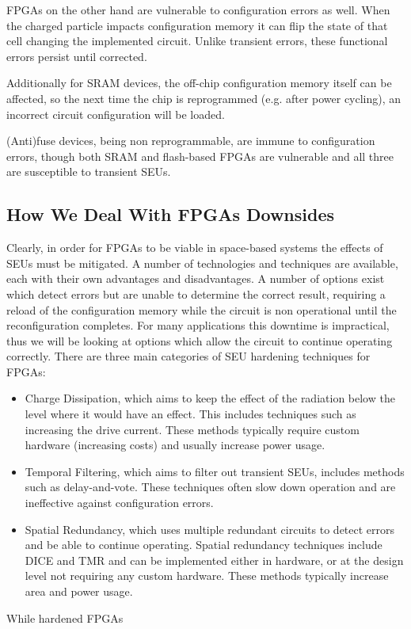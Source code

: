 \documentclass[12pt,final,oneside]{dwThesis} %
\begin{document}
   \glspl{FPGA} on the other hand are vulnerable to configuration errors as
   well. When the charged particle impacts configuration memory it can flip the
   state of that cell changing the implemented circuit. Unlike transient
   errors, these functional errors persist until corrected.

   Additionally for \gls{SRAM} devices, the off-chip configuration memory
   itself can be affected, so the next time the chip is reprogrammed (e.g.
   after power cycling), an incorrect circuit configuration will be loaded.

   (Anti)fuse devices, being non reprogrammable, are immune to configuration
   errors, though both \gls{SRAM} and flash-based \glspl{FPGA} are vulnerable
   and all three are susceptible to transient \glspl{SEU}\cite{HFPP}.

   \subsection{How We Deal With \glspl{FPGA} Downsides} Clearly, in order for
   \glspl{FPGA} to be viable in space-based systems the effects of \glspl{SEU}
   must be mitigated. A number of technologies and techniques are available,
   each with their own advantages and disadvantages. A number of options exist
   which detect errors but are unable to determine the correct result,
   requiring a reload of the configuration memory while the circuit is non
   operational until the reconfiguration completes. For many applications this
   downtime is impractical, thus we will be looking at options which allow the
   circuit to continue operating correctly.  There are three main categories of
   \gls{SEU} hardening techniques for \glspl{FPGA}\cite{HardeningTechniques}:
   \begin{itemize}
      \item Charge Dissipation, which aims to keep the effect of the radiation
            below the level where it would have an effect. This includes
            techniques such as increasing the drive current. These methods
            typically require custom hardware (increasing costs) and usually
            increase power usage.
      \item Temporal Filtering, which aims to filter out transient \glspl{SEU},
            includes methods such as delay-and-vote\cite{HardeningTechniques}.
            These techniques often slow down operation and are ineffective
            against configuration errors.
      \item Spatial Redundancy, which uses multiple redundant circuits to
            detect errors and be able to continue operating. Spatial redundancy
            techniques include \gls{DICE}\cite{DICE} and \gls{TMR} and can be
            implemented either in hardware, or at the design level not
            requiring any custom hardware. These methods typically increase
            area and power usage.  \end{itemize} While hardened \glspl{FPGA}
\end{document}
